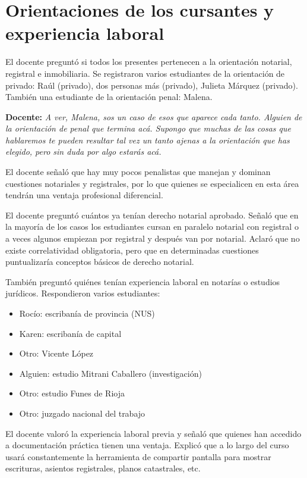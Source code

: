 \documentclass[12pt,oneside]{book}
\begin{document}
\section{Orientaciones de los cursantes y experiencia laboral}
\label{sec:orientaciones}

El docente preguntó si todos los presentes pertenecen a la orientación notarial, registral e inmobiliaria. Se registraron varios estudiantes de la orientación de privado: Raúl (privado), dos personas más (privado), Julieta Márquez (privado). También una estudiante de la orientación penal: Malena.

\begin{note}
\textbf{Docente:} \textit{A ver, Malena, sos un caso de esos que aparece cada tanto. Alguien de la orientación de penal que termina acá. Supongo que muchas de las cosas que hablaremos te pueden resultar tal vez un tanto ajenas a la orientación que has elegido, pero sin duda por algo estarás acá.}
\end{note}

El docente señaló que hay muy pocos penalistas que manejan y dominan cuestiones notariales y registrales, por lo que quienes se especialicen en esta área tendrán una ventaja profesional diferencial.

El docente preguntó cuántos ya tenían derecho notarial aprobado. Señaló que en la mayoría de los casos los estudiantes cursan en paralelo notarial con registral o a veces algunos empiezan por registral y después van por notarial. Aclaró que no existe correlatividad obligatoria, pero que en determinadas cuestiones puntualizaría conceptos básicos de derecho notarial.

También preguntó quiénes tenían experiencia laboral en notarías o estudios jurídicos. Respondieron varios estudiantes:

\begin{itemize}
    \item Rocío: escribanía de provincia (NUS)
    \item Karen: escribanía de capital
    \item Otro: Vicente López
    \item Alguien: estudio Mitrani Caballero (investigación)
    \item Otro: estudio Funes de Rioja
    \item Otro: juzgado nacional del trabajo
\end{itemize}

El docente valoró la experiencia laboral previa y señaló que quienes han accedido a documentación práctica tienen una ventaja. Explicó que a lo largo del curso usará constantemente la herramienta de compartir pantalla para mostrar escrituras, asientos registrales, planos catastrales, etc.
\end{document}
